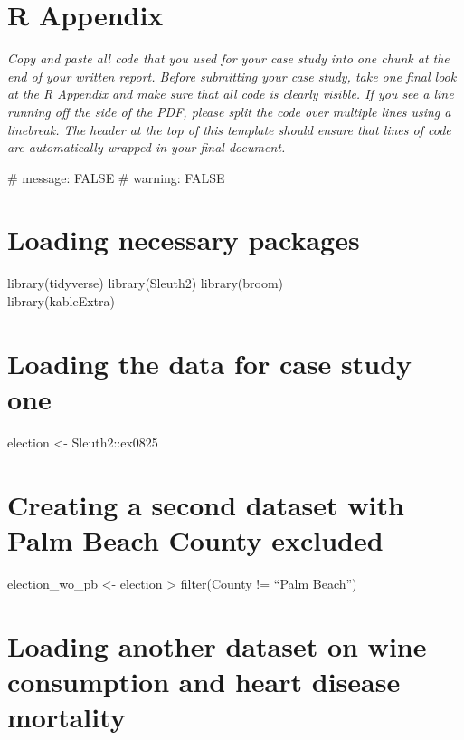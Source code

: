 \documentclass[
  letterpaper,
  DIV=11,
  numbers=noendperiod]{scrartcl}
\begin{document}
\hypertarget{r-appendix}{%
\section{R Appendix}\label{r-appendix}}

\emph{Copy and paste all code that you used for your case study into one
chunk at the end of your written report. Before submitting your case
study, take one final look at the R Appendix and make sure that all code
is clearly visible. If you see a line running off the side of the PDF,
please split the code over multiple lines using a linebreak. The header
at the top of this template should ensure that lines of code are
automatically wrapped in your final document.}

\#\textbar{} message: FALSE \#\textbar{} warning: FALSE

\hypertarget{loading-necessary-packages}{%
\section{Loading necessary packages}\label{loading-necessary-packages}}

library(tidyverse) library(Sleuth2) library(broom)\\
library(kableExtra)

\hypertarget{loading-the-data-for-case-study-one}{%
\section{Loading the data for case study
one}\label{loading-the-data-for-case-study-one}}

election \textless- Sleuth2::ex0825

\hypertarget{creating-a-second-dataset-with-palm-beach-county-excluded}{%
\section{Creating a second dataset with Palm Beach County
excluded}\label{creating-a-second-dataset-with-palm-beach-county-excluded}}

election\_wo\_pb \textless- election \textbar\textgreater{}
filter(County != ``Palm Beach'')

\hypertarget{loading-another-dataset-on-wine-consumption-and-heart-disease-mortality}{%
\section{Loading another dataset on wine consumption and heart disease
mortality}\label{loading-another-dataset-on-wine-consumption-and-heart-disease-mortality}}
\end{document}
